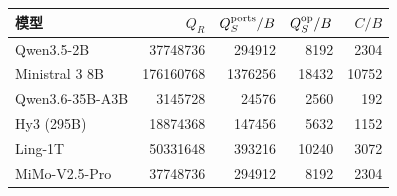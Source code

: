 \begin{tabular}{@{}lrrrr@{}}\toprule
模型 & $Q_R$ & $Q_S^{\rm ports}/B$ & $Q_S^{\rm op}/B$ & $C/B$\\\midrule
Qwen3.5-2B & 37748736 & 294912 & 8192 & 2304\\
Ministral 3 8B & 176160768 & 1376256 & 18432 & 10752\\
Qwen3.6-35B-A3B & 3145728 & 24576 & 2560 & 192\\
Hy3 (295B) & 18874368 & 147456 & 5632 & 1152\\
Ling-1T & 50331648 & 393216 & 10240 & 3072\\
MiMo-V2.5-Pro & 37748736 & 294912 & 8192 & 2304\\
\bottomrule\end{tabular}
